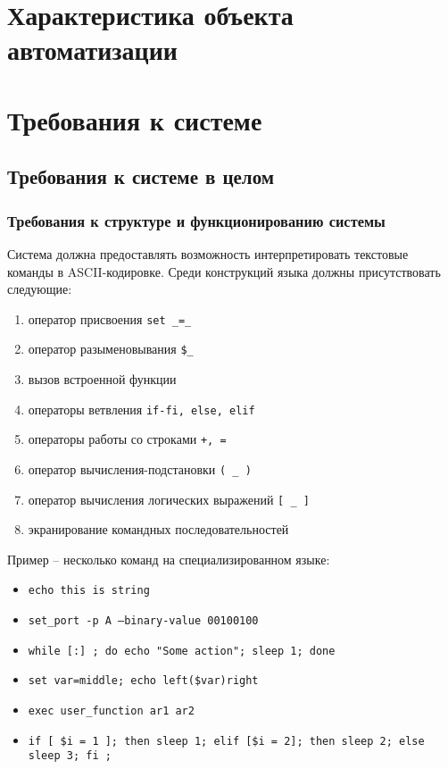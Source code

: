 \documentclass[a4paper, 12pt]{report}
\begin{document}
\section{Характеристика объекта автоматизации}

\section{Требования к системе}


\subsection{Требования к системе в целом}

\subsubsection{Требования к структуре и функционированию системы}

Система должна предоставлять возможность интерпретировать текстовые команды в ASCII-кодировке.
Среди конструкций языка должны присутствовать следующие:
\begin{enumerate}
	\item оператор присвоения {\tt set \_=\_}
	\item оператор разыменовывания {\tt \$\_}
	\item вызов встроенной функции
	\item операторы ветвления {\tt if-fi, else, elif}
	\item операторы работы со строками {\tt +, =}
	\item оператор вычисления-подстановки {\tt ( \_ )}
	\item оператор вычисления логических выражений {\tt [ \_ ]}
	\item экранирование командных последовательностей
\end{enumerate}

Пример -- несколько команд на специализированном языке:
\begin{itemize}
	\item {\tt echo this is string}
	\item {\tt set\_port -p A --binary-value 00100100}
	\item {\tt while [:] ; do echo "Some action"; sleep 1; done}
	\item {\tt set var=middle; echo left(\$var)right}
	\item {\tt exec user\_function ar1 ar2}
	\item {\tt if [ \$i = 1 ]; then sleep 1; elif [\$i = 2]; then sleep 2; else sleep 3; fi ;}
\end{itemize}
\end{document}
